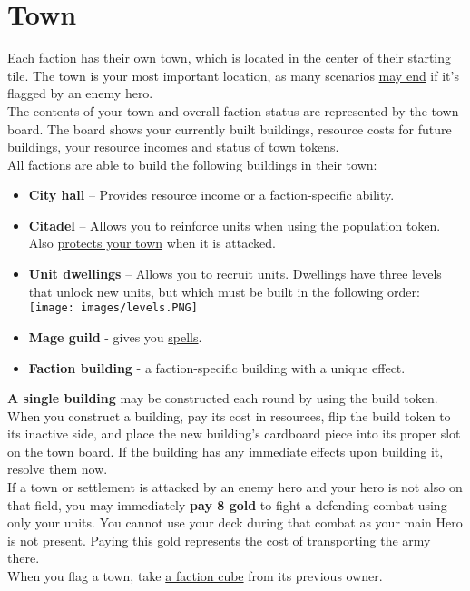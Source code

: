 \documentclass[12pt]{article}
\begin{document}
\section[Town]{Town\hypertarget{Town}{}}
Each faction has their own town, which is located in the center of their starting tile. The town is your most important location, as many scenarios \hyperlink{End}{may end} if it's flagged by an enemy hero.\\[6pt]
The contents of your town and overall faction status are represented by the town board. The board shows your currently built buildings, resource costs for future buildings, your resource incomes and status of town tokens.\\[6pt]
All factions are able to build the following buildings in their town:
\begin{itemize}
    \item \textbf{City hall} – Provides resource income or a faction-specific ability.
    \item \textbf{Citadel} – Allows you to reinforce units when using the population token. Also \hyperlink{Walls}{protects your town} when it is attacked.
    \item \textbf{Unit dwellings} – Allows you to recruit units. Dwellings have three levels that unlock new units, but which must be built in the following order:\texttt{[image: images/levels.PNG]}
    \item \textbf{Mage guild} - gives you \hyperlink{spells}{spells}.
    \item \textbf{Faction building} - a faction-specific building with a unique effect.
\end{itemize}
\textbf{A single building} may be constructed each round by using the build token. When you construct a building, pay its cost in resources, flip the build token to its inactive side, and place the new building’s cardboard piece into its proper slot on the town board. If the building has any immediate effects upon building it, resolve them now.\\[6pt]
If a town or settlement is attacked by an enemy hero and your hero is not also on that field, you may immediately \textbf{pay 8 gold} to fight a defending combat using only your units. You cannot use your deck during that combat as your main Hero is not present. Paying this gold represents the cost of transporting the army there.\\[6pt]
When you flag a town, take \hyperlink{End}{a faction cube} from its previous owner.
\end{document}
